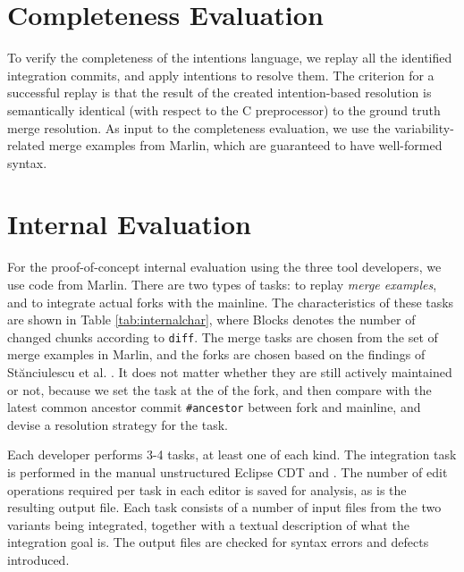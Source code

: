 \section{Completeness Evaluation}
To verify the completeness of the intentions language, we replay all the identified integration commits, and apply intentions to resolve them. The criterion for a successful replay is that the result of the created intention-based resolution is semantically identical (with respect to the C preprocessor) to the ground truth merge resolution. As input to the completeness evaluation, we use the variability-related merge examples from Marlin, which are guaranteed to have well-formed syntax.

\section{Internal Evaluation}
For the proof-of-concept internal evaluation using the three tool developers, we use code from Marlin. There are two types of tasks: to replay \textit{merge examples}, and to integrate actual forks with the mainline. The characteristics of these tasks are shown in Table \ref{tab:internalchar}, where Blocks denotes the number of changed chunks according to \texttt{diff}. The merge tasks are chosen from the set of merge examples in Marlin, and the forks are chosen based on the findings of St\u{a}nciulescu et al. \cite{stanciulescu2015}. It does not matter whether they are still actively maintained or not, because we set the task at the \head of the fork, and then compare with the latest common ancestor commit \texttt{\#ancestor} between fork and mainline, and devise a resolution strategy for the task.

Each developer performs 3-4 tasks, at least one of each kind. The integration task is performed in the manual unstructured Eclipse CDT and \tooln. The number of edit operations required per task in each editor is saved for analysis, as is the resulting output file. Each task consists of a number of input files from the two variants being integrated, together with a textual description of what the integration goal is. The output files are checked for syntax errors and defects introduced.

